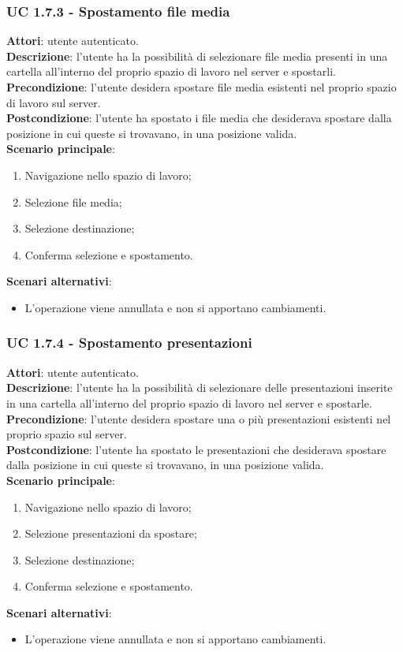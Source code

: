 	\subsubsection{UC 1.7.3 - Spostamento file media}{
		\label{uc1.7.3}
		\textbf{Attori}: utente autenticato.	\\
		\textbf{Descrizione}: l'utente ha la possibilità di selezionare file media presenti in una cartella all'interno del proprio spazio di lavoro nel server e spostarli. \\
		\textbf{Precondizione}: l'utente desidera spostare file media esistenti nel proprio spazio di lavoro sul server.	\\
		\textbf{Postcondizione}: l'utente ha spostato i file media che desiderava spostare dalla posizione in cui queste si trovavano, in una posizione valida.	\\
		\textbf{Scenario principale}:
		\begin{enumerate}
			\item Navigazione nello spazio di lavoro;
			\item Selezione file media;
			\item Selezione destinazione;
			\item Conferma selezione e spostamento.
		\end{enumerate}
		\textbf{Scenari alternativi}: 
		\begin{itemize}
			\item L'operazione viene annullata e non si apportano cambiamenti.
		\end{itemize}
		}
	\subsubsection{UC 1.7.4 - Spostamento presentazioni}{
		\label{uc1.7.4}
		\textbf{Attori}: utente autenticato.	\\
		\textbf{Descrizione}: l'utente ha la possibilità di selezionare delle presentazioni inserite in una cartella all'interno del proprio spazio di lavoro nel server e spostarle. \\
		\textbf{Precondizione}: l'utente desidera spostare una o più presentazioni esistenti nel proprio spazio sul server.	\\
		\textbf{Postcondizione}: l'utente ha spostato le presentazioni che desiderava spostare dalla posizione in cui queste si trovavano, in una posizione valida.	\\
		\textbf{Scenario principale}:
		\begin{enumerate}
			\item Navigazione nello spazio di lavoro;
			\item Selezione presentazioni da spostare;
			\item Selezione destinazione;
			\item Conferma selezione e spostamento.
		\end{enumerate}
		\textbf{Scenari alternativi}: 
		\begin{itemize}
			\item L'operazione viene annullata e non si apportano cambiamenti.
		\end{itemize}
		}

